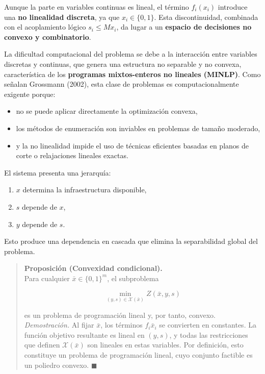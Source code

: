 \documentclass[
  spanish,
  us-letterpaper,
]{scrreprt}
\providecommand{\tightlist}{%
  \setlength{\itemsep}{0pt}\setlength{\parskip}{0pt}}
\numberwithin{equation}{section}
\begin{document}
Aunque la parte en variables continuas es lineal, el término
\(f_i(x_i)\) introduce una \textbf{no linealidad discreta}, ya que
\(x_i \in \{0,1\}\). Esta discontinuidad, combinada con el acoplamiento
lógico \(s_i \leq M x_i\), da lugar a un \textbf{espacio de decisiones
no convexo y combinatorio}.

La dificultad computacional del problema se debe a la interacción entre
variables discretas y continuas, que genera una estructura no separable
y no convexa, característica de los \textbf{programas mixtos-enteros no
lineales (MINLP)}. Como señalan Grossmann (2002), esta clase de
problemas es computacionalmente exigente porque:

\begin{itemize}
\tightlist
\item
  no se puede aplicar directamente la optimización convexa,
\item
  los métodos de enumeración son inviables en problemas de tamaño
  moderado,
\item
  y la no linealidad impide el uso de técnicas eficientes basadas en
  planos de corte o relajaciones lineales exactas.
\end{itemize}

El sistema presenta una jerarquía:

\begin{enumerate}
\def\labelenumi{\arabic{enumi}.}
\tightlist
\item
  \(x\) determina la infraestructura disponible,\\
\item
  \(s\) depende de \(x\),\\
\item
  \(y\) depende de \(s\).
\end{enumerate}

Esto produce una dependencia en cascada que elimina la separabilidad
global del problema.

\begin{quote}
\textbf{Proposición (Convexidad condicional).}\\
Para cualquier \(\bar{x} \in \{0,1\}^m\), el subproblema

\[
\min_{(y,s) \in \mathcal{X}(\bar{x})} Z(\bar{x}, y, s)
\]

es un problema de programación lineal y, por tanto, convexo.\\
\emph{Demostración.} Al fijar \(\bar{x}\), los términos
\(f_i \bar{x}_i\) se convierten en constantes. La función objetivo
resultante es lineal en \((y,s)\), y todas las restricciones que definen
\(\mathcal{X}(\bar{x})\) son lineales en estas variables. Por
definición, esto constituye un problema de programación lineal, cuyo
conjunto factible es un poliedro convexo. \(\blacksquare\)
\end{quote}
\end{document}
